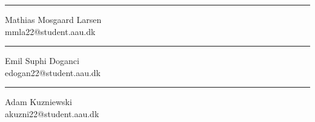 \thispagestyle{empty}
\indent\vspace{80pt}
\begin{minipage}{0.5\textwidth}
    \hrule %
    \vspace{5pt}
    \centering
    {Mathias Mosgaard Larsen\\
    \footnotesize mmla22@student.aau.dk}
\end{minipage}
\begin{minipage}{0.5\textwidth}
    \hrule %
    \vspace{5pt}
    \centering
    {Emil Suphi Doganci\\
    \footnotesize edogan22@student.aau.dk}
\end{minipage}

\vspace{100pt}

\begin{minipage}[b]{0.5\textwidth}
    \hrule %
    \vspace{5pt}
    \centering
    {Adam Kuzniewski\\
    \footnotesize akuzni22@student.aau.dk}
\end{minipage}

\newpage